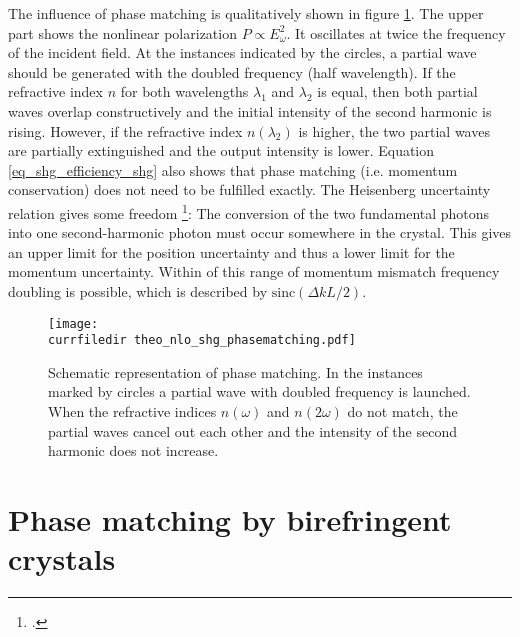 The influence of phase matching is qualitatively shown in figure
\ref{fig_shg_phase_matching}. The upper part shows the nonlinear 
polarization $P \propto E_{\omega}^2$. It oscillates
at twice the frequency of the incident field. At the instances indicated by the circles,  a partial wave should  be generated with
the doubled frequency (half wavelength). If the
refractive index $n$ for both wavelengths $\lambda_1$ and
$\lambda_2$ is equal, then both partial waves overlap
constructively and the initial intensity of the second harmonic
is rising. However, if the refractive index $n(\lambda_2)$ is higher,
the two partial waves are partially extinguished and the
output intensity is lower. Equation
\ref{eq_shg_efficiency_shg} also shows that 
phase matching (i.e. momentum conservation) does not need to be fulfilled  exactly.  The Heisenberg uncertainty relation gives some freedom
\footcite{Demtroeder_laser,SalehTeich1991}:
The conversion of the two fundamental photons into one second-harmonic photon 
must occur somewhere in the crystal. This gives an upper limit for  the position uncertainty and thus a lower limit for the momentum uncertainty.
Within
of this  range of momentum mismatch frequency doubling  is possible, which is described by $\text{sinc}(\Delta k L/2)$.




\begin{figure}
\center
\texttt{[image: \\currfiledir theo\_nlo\_shg\_phasematching.pdf]}
\caption{Schematic representation of 
phase matching.
In the instances marked by circles a
partial wave with doubled frequency is launched. When the
refractive indices $n(\omega)$ and $n(2 \omega)$ do not
match, the partial waves cancel out each other  and
the intensity of the second harmonic does not increase.}
\label{fig_shg_phase_matching}
\end{figure}


\section{Phase matching by birefringent crystals}


